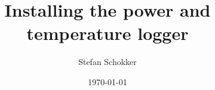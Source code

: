 \documentclass[a4paper, 12pt, one column, aas_macros]{article}
\begin{document}
\begin{titlepage}
    \title{
        Installing the power and temperature logger
    }
    \author{Stefan Schokker}
    \date{\today}
    \thispagestyle{empty}
\end{titlepage}

\maketitle
\thispagestyle{empty}

\newpage
\thispagestyle{empty}
\tableofcontents
\newpage

\setcounter{page}{1}


\end{document}
